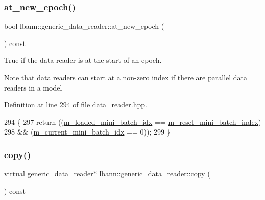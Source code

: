 \subsubsection{\texorpdfstring{at\+\_\+new\+\_\+epoch()}{at\_new\_epoch()}}
{\footnotesize\ttfamily bool lbann\+::generic\+\_\+data\+\_\+reader\+::at\+\_\+new\+\_\+epoch (\begin{DoxyParamCaption}{ }\end{DoxyParamCaption}) const\hspace{0.3cm}{\ttfamily [inline]}}



True if the data reader is at the start of an epoch. 

Note that data readers can start at a non-\/zero index if there are parallel data readers in a model 

Definition at line 294 of file data\+\_\+reader.\+hpp.


\begin{DoxyCode}
294                             \{
297     \textcolor{keywordflow}{return} ((\hyperlink{classlbann_1_1generic__data__reader_a2cfc5a3e6de8a8a24d3525ec3ed586fb}{m\_loaded\_mini\_batch\_idx} == 
      \hyperlink{classlbann_1_1generic__data__reader_af29f62579a408d1548a124442bcf181d}{m\_reset\_mini\_batch\_index})
298             && (\hyperlink{classlbann_1_1generic__data__reader_aefd4bc0bf95de1e2500827581acf3536}{m\_current\_mini\_batch\_idx} == 0));
299   \}
\end{DoxyCode}
\mbox{\label{classlbann_1_1generic__data__reader_a208ba1223e7aaa75e94b728501f12f86}} 
\subsubsection{\texorpdfstring{copy()}{copy()}}
{\footnotesize\ttfamily virtual \hyperlink{classlbann_1_1generic__data__reader}{generic\+\_\+data\+\_\+reader}$\ast$ lbann\+::generic\+\_\+data\+\_\+reader\+::copy (\begin{DoxyParamCaption}{ }\end{DoxyParamCaption}) const\hspace{0.3cm}{\ttfamily [pure virtual]}}



